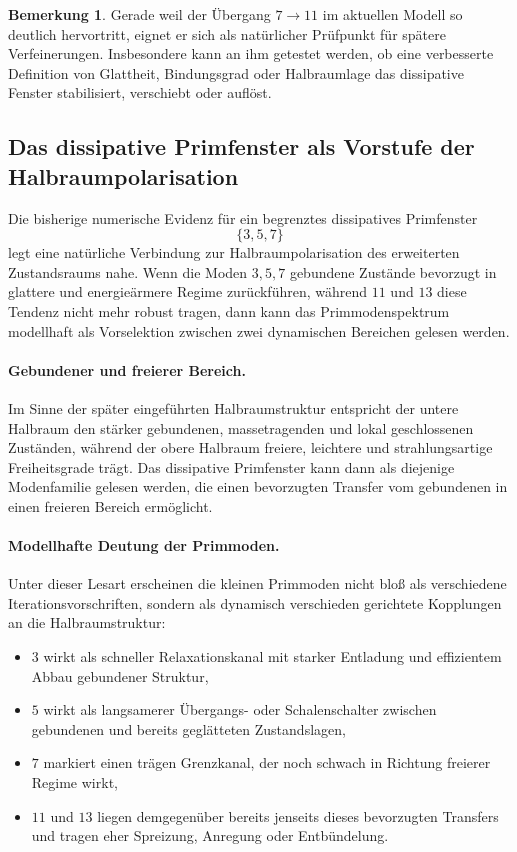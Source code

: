 \documentclass[11pt,a4paper]{article}
\theoremstyle{definition}
\newtheorem{bemerkung}{Bemerkung}
\begin{document}
\begin{bemerkung}
	Gerade weil der Übergang \(7\to 11\) im aktuellen Modell so deutlich hervortritt, eignet er sich als natürlicher Prüfpunkt für spätere Verfeinerungen. Insbesondere kann an ihm getestet werden, ob eine verbesserte Definition von Glattheit, Bindungsgrad oder Halbraumlage das dissipative Fenster stabilisiert, verschiebt oder auflöst.
\end{bemerkung}
\subsection{Das dissipative Primfenster als Vorstufe der Halbraumpolarisation}

Die bisherige numerische Evidenz für ein begrenztes dissipatives Primfenster
\[
\{3,5,7\}
\]
legt eine natürliche Verbindung zur Halbraumpolarisation des erweiterten Zustandsraums nahe. Wenn die Moden \(3,5,7\) gebundene Zustände bevorzugt in glattere und energieärmere Regime zurückführen, während \(11\) und \(13\) diese Tendenz nicht mehr robust tragen, dann kann das Primmodenspektrum modellhaft als Vorselektion zwischen zwei dynamischen Bereichen gelesen werden.

\paragraph{Gebundener und freierer Bereich.}
Im Sinne der später eingeführten Halbraumstruktur entspricht der untere Halbraum den stärker gebundenen, massetragenden und lokal geschlossenen Zuständen, während der obere Halbraum freiere, leichtere und strahlungsartige Freiheitsgrade trägt. Das dissipative Primfenster kann dann als diejenige Modenfamilie gelesen werden, die einen bevorzugten Transfer vom gebundenen in einen freieren Bereich ermöglicht.

\paragraph{Modellhafte Deutung der Primmoden.}
Unter dieser Lesart erscheinen die kleinen Primmoden nicht bloß als verschiedene Iterationsvorschriften, sondern als dynamisch verschieden gerichtete Kopplungen an die Halbraumstruktur:
\begin{itemize}
	\item \(3\) wirkt als schneller Relaxationskanal mit starker Entladung und effizientem Abbau gebundener Struktur,
	\item \(5\) wirkt als langsamerer Übergangs- oder Schalenschalter zwischen gebundenen und bereits geglätteten Zustandslagen,
	\item \(7\) markiert einen trägen Grenzkanal, der noch schwach in Richtung freierer Regime wirkt,
	\item \(11\) und \(13\) liegen demgegenüber bereits jenseits dieses bevorzugten Transfers und tragen eher Spreizung, Anregung oder Entbündelung.
\end{itemize}
\end{document}
